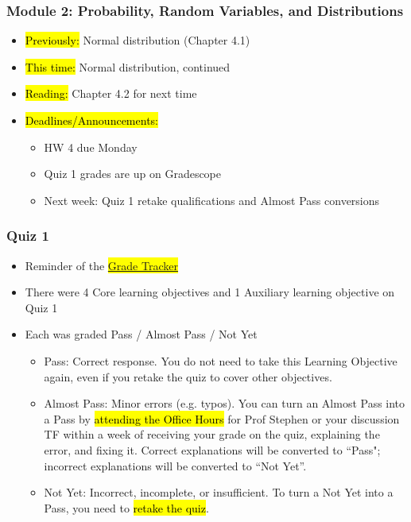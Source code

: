 
\begin{frame}
    \frametitle{Module 2: Probability, Random Variables, and Distributions}
    \begin{itemize}
        \item \hl{Previously: } Normal distribution (Chapter 4.1)
        \item \hl{This time: } Normal distribution, continued
        \item \hl{Reading: } Chapter 4.2 for next time
        \item \hl{Deadlines/Announcements: } 
        \begin{itemize}
            \item HW 4 due Monday
            \item Quiz 1 grades are up on Gradescope
            \item Next week: Quiz 1 retake qualifications and Almost Pass conversions
        \end{itemize}
    \end{itemize}
    
\end{frame}

\begin{frame}
    \frametitle{Quiz 1}
    \begin{itemize}
        \item Reminder of the \hl{\href{https://docs.google.com/spreadsheets/d/1yAqE1HUeVbe6xuhddNSIX7Y3zuvFHlsuIn8Ys7V9_a0}{Grade Tracker}}
        \item There were 4 Core learning objectives and 1 Auxiliary learning objective on Quiz 1
        \item Each was graded Pass / Almost Pass / Not Yet
        \begin{itemize}
            \item Pass: Correct response. You do not need to take this Learning Objective again, even if you retake the quiz to cover other objectives.
            \item Almost Pass: Minor errors (e.g. typos). You can turn an Almost Pass into a Pass by \hl{attending the Office Hours} for Prof Stephen or your discussion TF within a week of receiving your grade on the quiz, explaining the error, and fixing it. Correct explanations will be converted to ``Pass"; incorrect explanations will be converted to ``Not Yet''.
            \item Not Yet: Incorrect, incomplete, or insufficient. To turn a Not Yet into a Pass, you need to \hl{retake the quiz}.
        \end{itemize}
    \end{itemize}
\end{frame}

